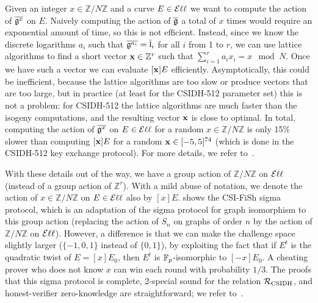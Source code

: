 Given an integer $x \in \mathbb{Z}/ N \mathbb{Z}$ and a curve $E \in \Ell$ we want to compute the action of $\overline{\fg^x}$ on $E$. Naively computing the action of $\overline{\fg}$ a total of $x$ times would require an exponential amount of time, so this is not efficient. Instead, since we know the discrete logarithms $a_i$ such that $\overline{\fg^{a_i}} = \overline{\fl}_i$ for all $i$ from 1 to $r$, we can use lattice algorithms to find a short vector $\bx \in \mathbb{Z}^r$ such that $\sum_{i=1}^r a_i x_i = x \mod N$. Once we have such a vector we can evaluate $[\bx]E$ efficiently. Asymptotically, this could be inefficient, because the lattice algorithms are too slow or produce vectors that are too large, but in practice (at least for the CSIDH-512 parameter set) this is not a problem: for CSIDH-512 the lattice algorithms are much faster than the isogeny computations, and the resulting vector $\bx$ is close to optimal. In total, computing the action of $\overline{\fg^x}$ on $E \in \Ell$ for a random $x \in \mathbb{Z}/ N \mathbb{Z}$ is only 15\% slower than computing $[\bx]E$ for a random $\bx \in [-5,5]^{74}$ (which is done in the CSIDH-512 key exchange protocol). For more details, we refer to~\cite{CSI-FiSh}.

With these details out of the way, we have a group action of $\mathbb{Z}/ N \mathbb{Z}$ on $\Ell$ (instead of a group action of $\mathbb{Z}^r$). With a mild abuse of notation, we denote the action of $x \in \mathbb{Z}/ N \mathbb{Z}$ on $E \in \Ell$ also by $[x]E$.  shows the CSI-FiSh sigma protocol, which is an adaptation of the sigma protocol for graph isomorphism to this group action (replacing the action of $S_n$ on graphs of order $n$ by the action of $\mathbb{Z}/ N \mathbb{Z}$ on $\Ell$). However, a difference is that we can make the challenge space slightly larger ($\{-1,0,1\}$ instead of $\{0,1\}$), by exploiting the fact that if $E^t$ is the quadratic twist of $E = [x]E_0$, then $E^t$ is $\Field_p$-isomorphic to $[-x]E_0$. A cheating prover who does not know $x$ can win each round with probability $1/3$. The proofs that this sigma protocol is complete, 2-special sound for the relation $\R[CSIDH]$,  and honest-verifier zero-knowledge are 
straightforward; 
we refer to~\cite{CSI-FiSh}.

